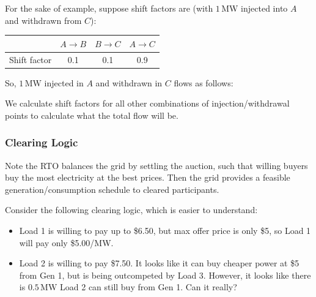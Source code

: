 \documentclass[11pt]{article}
\begin{document}
For the sake of example, suppose shift factors are (with $1\,\mathrm{MW}$ injected into $A$ and withdrawn from $C$):

\begin{center}
\begin{tabular}{lccc}
\toprule
 & $A\rightarrow B$ & $B\rightarrow C$ & $A\rightarrow C$ \\
\midrule
Shift factor & 0.1 & 0.1 & 0.9 \\
\bottomrule
\end{tabular}
\end{center}

So, $1\,\mathrm{MW}$ injected in $A$ and withdrawn in $C$ flows as follows:

\begin{center}
\end{center}

We calculate shift factors for all other combinations of injection/withdrawal points to calculate what the total flow will be.

\subsubsection*{Clearing Logic}

Note the RTO balances the grid by settling the auction, such that willing buyers buy the most electricity at the best prices. Then the grid provides a feasible generation/consumption schedule to cleared participants.

\newpage
Consider the following clearing logic, which is easier to understand:
\begin{itemize}
  \item Load 1 is willing to pay up to \$6.50, but max offer price is only \$5, so Load 1 will pay only \$5.00/MW.
  \item Load 2 is willing to pay \$7.50. It looks like it can buy cheaper power at \$5 from Gen 1, but is being outcompeted by Load 3. However, it looks like there is $0.5\,\mathrm{MW}$ Load 2 can still buy from Gen 1. Can it really?
\end{itemize}
\end{document}
